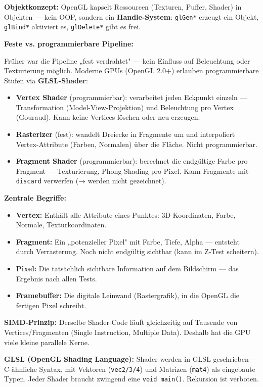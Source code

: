\documentclass[12pt, a4paper]{article}
\begin{document}
\medskip
\textbf{Objektkonzept:} OpenGL kapselt Ressourcen (Texturen, Puffer, Shader) in Objekten — kein OOP, sondern ein \textbf{Handle-System}: \texttt{glGen*} erzeugt ein Objekt, \texttt{glBind*} aktiviert es, \texttt{glDelete*} gibt es frei.

\medskip
\textbf{Feste vs. programmierbare Pipeline:}

Früher war die Pipeline „fest verdrahtet" — kein Einfluss auf Beleuchtung oder Texturierung möglich. Moderne GPUs (OpenGL 2.0+) erlauben programmierbare Stufen via \textbf{GLSL-Shader}:

\begin{itemize}
  \item \textbf{Vertex Shader} (programmierbar): verarbeitet jeden Eckpunkt einzeln — Transformation (Model-View-Projektion) und Beleuchtung pro Vertex (Gouraud). Kann keine Vertices löschen oder neu erzeugen.
  \item \textbf{Rasterizer} (fest): wandelt Dreiecke in Fragmente um und interpoliert Vertex-Attribute (Farben, Normalen) über die Fläche. Nicht programmierbar.
  \item \textbf{Fragment Shader} (programmierbar): berechnet die endgültige Farbe pro Fragment — Texturierung, Phong-Shading pro Pixel. Kann Fragmente mit \texttt{discard} verwerfen (→ werden nicht gezeichnet).
\end{itemize}

\textbf{Zentrale Begriffe:}
\begin{itemize}
  \item \textbf{Vertex:} Enthält alle Attribute eines Punktes: 3D-Koordinaten, Farbe, Normale, Texturkoordinaten.
  \item \textbf{Fragment:} Ein „potenzieller Pixel" mit Farbe, Tiefe, Alpha — entsteht durch Verrasterung. Noch nicht endgültig sichtbar (kann im Z-Test scheitern).
  \item \textbf{Pixel:} Die tatsächlich sichtbare Information auf dem Bildschirm — das Ergebnis nach allen Tests.
  \item \textbf{Framebuffer:} Die digitale Leinwand (Rastergrafik), in die OpenGL die fertigen Pixel schreibt.
\end{itemize}

\textbf{SIMD-Prinzip:} Derselbe Shader-Code läuft gleichzeitig auf Tausende von Vertices/Fragmenten (Single Instruction, Multiple Data). Deshalb hat die GPU viele kleine parallele Kerne.

\medskip
\textbf{GLSL (OpenGL Shading Language):} Shader werden in GLSL geschrieben — C-ähnliche Syntax, mit Vektoren (\texttt{vec2/3/4}) und Matrizen (\texttt{mat4}) als eingebaute Typen. Jeder Shader braucht zwingend eine \texttt{void main()}. Rekursion ist verboten.
\end{document}
